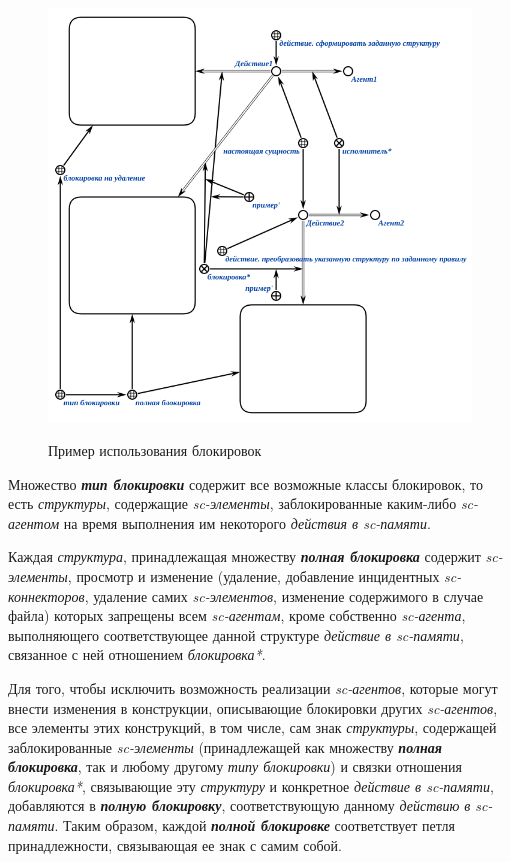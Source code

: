 \begin{figure}[H]
	\centering
	\caption{Пример использования блокировок}
	\includegraphics[scale=0.8]{images/part3/chapter_situation_management/lock.png}
	\label{fig:lock}
\end{figure}

Множество \textbf{\textit{тип блокировки}} содержит все возможные классы блокировок, то есть \textit{структуры}, содержащие \textit{sc-элементы}, заблокированные каким-либо \textit{sc-агентом} на время выполнения им некоторого \textit{действия в sc-памяти}.

Каждая \textit{структура}, принадлежащая множеству \textbf{\textit{полная блокировка}} содержит \textit{sc-элементы}, просмотр и изменение (удаление, добавление инцидентных \textit{sc-коннекторов}, удаление самих \textit{sc-элементов}, изменение содержимого в случае файла) которых запрещены всем \textit{sc-агентам}, кроме собственно \textit{sc-агента}, выполняющего соответствующее данной структуре \textit{действие в sc-памяти}, связанное с ней отношением \textit{блокировка*}.
	
Для того, чтобы исключить возможность реализации \textit{sc-агентов}, которые могут внести изменения в конструкции, описывающие блокировки других \textit{sc-агентов}, все элементы этих конструкций, в том числе, сам знак \textit{структуры}, содержащей заблокированные \textit{sc-элементы} (принадлежащей как множеству \textbf{\textit{полная блокировка}}, так и любому другому \textit{типу блокировки}) и связки отношения \textit{блокировка*}, связывающие эту \textit{структуру} и конкретное \textit{действие в sc-памяти}, добавляются в \textbf{\textit{полную блокировку}}, соответствующую данному \textit{действию в sc-памяти}. Таким образом, каждой \textbf{\textit{полной блокировке}} соответствует петля принадлежности, связывающая ее знак с самим собой.

